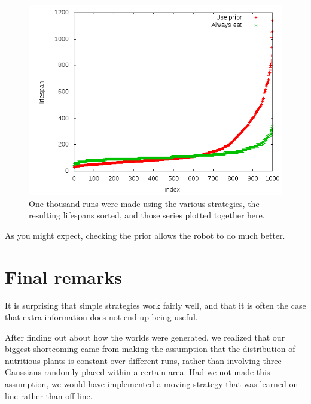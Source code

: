 \documentclass{article}
\begin{document}
\begin{figure}
  \begin{center}
    \includegraphics[width=.8\columnwidth]{always_vs_prior.png}
  \end{center}
  \caption{One thousand runs were made using the various strategies,
    the resulting lifespans sorted, and those series plotted together
    here.}
  \label{fig:comparison}
\end{figure}

As you might expect, checking the prior allows the robot to do much
better.

\section{Final remarks}
It is surprising that simple strategies work fairly well, and that it
is often the case that extra information does not end up being useful.

After finding out about how the worlds were generated, we realized
that our biggest shortcoming came from making the assumption that the
distribution of nutritious plants is constant over different runs,
rather than involving three Gaussians randomly placed within a certain
area. Had we not made this assumption, we would have implemented a
moving strategy that was learned on-line rather than off-line.
\end{document}
